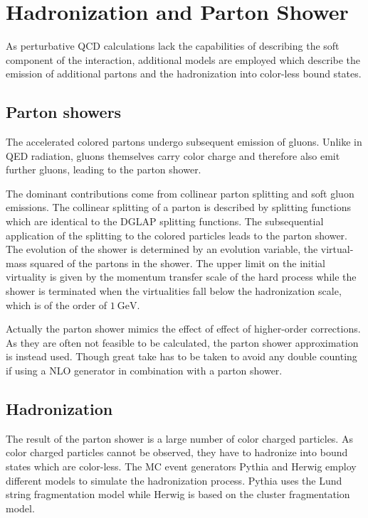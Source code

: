 \section{Hadronization and Parton Shower}

As perturbative QCD calculations lack the capabilities of describing the
soft component of the interaction, additional models are employed which describe
the emission of additional partons and the hadronization into color-less bound
states. 

\subsection{Parton showers}

The accelerated colored partons undergo subsequent emission of gluons. Unlike in
QED radiation, gluons themselves carry color charge and therefore also emit
further gluons, leading to the parton shower. 

The dominant contributions come from collinear parton splitting and soft gluon
emissions. The collinear splitting of a parton is described by splitting
functions which are identical to the DGLAP splitting functions. The
subsequential application of the splitting to the colored particles leads to the
parton shower. The evolution of the shower is determined by an evolution
variable, \eg the virtual-mass squared of the partons in the shower. The upper
limit on the initial virtuality is given by the momentum transfer scale of the
hard process while the shower is terminated when the virtualities fall below the
hadronization scale, which is of the order of $\SI{1}{\GeV}$.

Actually the parton shower mimics the effect of effect of higher-order
corrections. As they are often not feasible to be calculated, the parton shower
approximation is instead used. Though great take has to be taken to avoid any
double counting if using a NLO generator in combination with a parton shower.


\subsection{Hadronization}

The result of the parton shower is a large number of color charged particles. As
color charged particles cannot be observed, they have to hadronize into bound
states which are color-less. The MC event generators Pythia and Herwig employ
different models to simulate the hadronization process. Pythia uses the Lund
string fragmentation model while Herwig is based on the cluster fragmentation
model.

